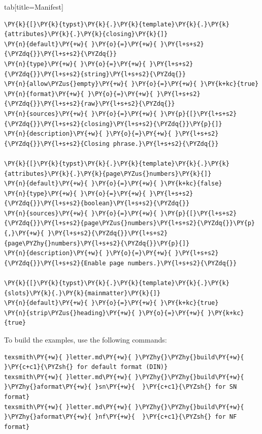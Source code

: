 \documentclass[a4paper,twoside]{article}
\begin{document}
\begin{tsdiv}{tab}[title=Manifest]
\begin{tscode}[lang=toml, engine=pygments]
\begin{Verbatim}[commandchars=\\\{\},breaklines, breakanywhere, commandchars=\\\{\}]
\PY{k}{[}\PY{k}{typst}\PY{k}{.}\PY{k}{template}\PY{k}{.}\PY{k}{attributes}\PY{k}{.}\PY{k}{closing}\PY{k}{]}
\PY{n}{default}\PY{+w}{ }\PY{o}{=}\PY{+w}{ }\PY{l+s+s2}{\PYZdq{}}\PY{l+s+s2}{\PYZdq{}}
\PY{n}{type}\PY{+w}{ }\PY{o}{=}\PY{+w}{ }\PY{l+s+s2}{\PYZdq{}}\PY{l+s+s2}{string}\PY{l+s+s2}{\PYZdq{}}
\PY{n}{allow\PYZus{}empty}\PY{+w}{ }\PY{o}{=}\PY{+w}{ }\PY{k+kc}{true}
\PY{n}{format}\PY{+w}{ }\PY{o}{=}\PY{+w}{ }\PY{l+s+s2}{\PYZdq{}}\PY{l+s+s2}{raw}\PY{l+s+s2}{\PYZdq{}}
\PY{n}{sources}\PY{+w}{ }\PY{o}{=}\PY{+w}{ }\PY{p}{[}\PY{l+s+s2}{\PYZdq{}}\PY{l+s+s2}{closing}\PY{l+s+s2}{\PYZdq{}}\PY{p}{]}
\PY{n}{description}\PY{+w}{ }\PY{o}{=}\PY{+w}{ }\PY{l+s+s2}{\PYZdq{}}\PY{l+s+s2}{Closing phrase.}\PY{l+s+s2}{\PYZdq{}}

\PY{k}{[}\PY{k}{typst}\PY{k}{.}\PY{k}{template}\PY{k}{.}\PY{k}{attributes}\PY{k}{.}\PY{k}{page\PYZus{}numbers}\PY{k}{]}
\PY{n}{default}\PY{+w}{ }\PY{o}{=}\PY{+w}{ }\PY{k+kc}{false}
\PY{n}{type}\PY{+w}{ }\PY{o}{=}\PY{+w}{ }\PY{l+s+s2}{\PYZdq{}}\PY{l+s+s2}{boolean}\PY{l+s+s2}{\PYZdq{}}
\PY{n}{sources}\PY{+w}{ }\PY{o}{=}\PY{+w}{ }\PY{p}{[}\PY{l+s+s2}{\PYZdq{}}\PY{l+s+s2}{page\PYZus{}numbers}\PY{l+s+s2}{\PYZdq{}}\PY{p}{,}\PY{+w}{ }\PY{l+s+s2}{\PYZdq{}}\PY{l+s+s2}{page\PYZhy{}numbers}\PY{l+s+s2}{\PYZdq{}}\PY{p}{]}
\PY{n}{description}\PY{+w}{ }\PY{o}{=}\PY{+w}{ }\PY{l+s+s2}{\PYZdq{}}\PY{l+s+s2}{Enable page numbers.}\PY{l+s+s2}{\PYZdq{}}

\PY{k}{[}\PY{k}{typst}\PY{k}{.}\PY{k}{template}\PY{k}{.}\PY{k}{slots}\PY{k}{.}\PY{k}{mainmatter}\PY{k}{]}
\PY{n}{default}\PY{+w}{ }\PY{o}{=}\PY{+w}{ }\PY{k+kc}{true}
\PY{n}{strip\PYZus{}heading}\PY{+w}{ }\PY{o}{=}\PY{+w}{ }\PY{k+kc}{true}
\end{Verbatim}
\end{tscode}
\end{tsdiv}
To build the examples, use the following commands:
\begin{tscode}[lang=bash, engine=pygments]
\begin{Verbatim}[commandchars=\\\{\},breaklines, breakanywhere, commandchars=\\\{\}]
texsmith\PY{+w}{ }letter.md\PY{+w}{ }\PYZhy{}\PYZhy{}build\PY{+w}{ }\PY{c+c1}{\PYZsh{} for default format (DIN)}
texsmith\PY{+w}{ }letter.md\PY{+w}{ }\PYZhy{}\PYZhy{}build\PY{+w}{ }\PYZhy{}aformat\PY{+w}{ }sn\PY{+w}{  }\PY{c+c1}{\PYZsh{} for SN format}
texsmith\PY{+w}{ }letter.md\PY{+w}{ }\PYZhy{}\PYZhy{}build\PY{+w}{ }\PYZhy{}aformat\PY{+w}{ }nf\PY{+w}{  }\PY{c+c1}{\PYZsh{} for NF format}
\end{Verbatim}
\end{tscode}
\end{document}
